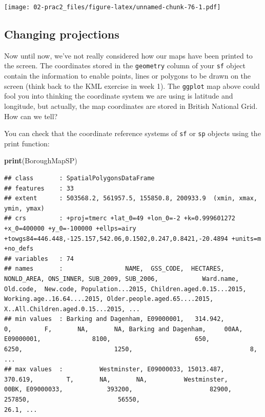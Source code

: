 \documentclass[]{book}
\newenvironment{Shaded}{\begin{snugshade}}{\end{snugshade}}
\newcommand{\KeywordTok}[1]{\textcolor[rgb]{0.13,0.29,0.53}{\textbf{#1}}}
\newcommand{\NormalTok}[1]{#1}
\begin{document}
\texttt{[image: 02-prac2\_files/figure-latex/unnamed-chunk-76-1.pdf]}

\hypertarget{changing-projections}{%
\subsection{Changing projections}\label{changing-projections}}

Now until now, we've not really considered how our maps have been printed to the screen. The coordinates stored in the \texttt{geometry} column of your \texttt{sf} object contain the information to enable points, lines or polygons to be drawn on the screen (think back to the KML exercise in week 1). The \texttt{ggplot} map above could fool you into thinking the coordinate system we are using is latitude and longitude, but actually, the map coordinates are stored in British National Grid. How can we tell?

You can check that the coordinate reference systems of \texttt{sf} or \texttt{sp} objects using the print function:

\begin{Shaded}
\begin{Highlighting}[]
\KeywordTok{print}\NormalTok{(BoroughMapSP)}
\end{Highlighting}
\end{Shaded}

\begin{verbatim}
## class       : SpatialPolygonsDataFrame 
## features    : 33 
## extent      : 503568.2, 561957.5, 155850.8, 200933.9  (xmin, xmax, ymin, ymax)
## crs         : +proj=tmerc +lat_0=49 +lon_0=-2 +k=0.999601272 +x_0=400000 +y_0=-100000 +ellps=airy +towgs84=446.448,-125.157,542.06,0.1502,0.247,0.8421,-20.4894 +units=m +no_defs 
## variables   : 74
## names       :                 NAME,  GSS_CODE,  HECTARES, NONLD_AREA, ONS_INNER, SUB_2009, SUB_2006,            Ward.name, Old.code,  New.code, Population...2015, Children.aged.0.15...2015, Working.age..16.64....2015, Older.people.aged.65....2015, X..All.Children.aged.0.15...2015, ... 
## min values  : Barking and Dagenham, E09000001,   314.942,          0,         F,       NA,       NA, Barking and Dagenham,     00AA, E09000001,              8100,                       650,                       6250,                         1250,                                8, ... 
## max values  :          Westminster, E09000033, 15013.487,    370.619,         T,       NA,       NA,          Westminster,     00BK, E09000033,            393200,                     82900,                     257850,                        56550,                             26.1, ...
\end{verbatim}
\end{document}

